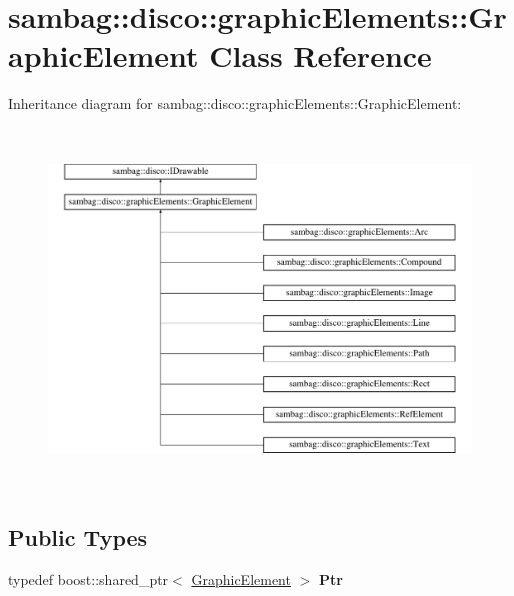 \hypertarget{classsambag_1_1disco_1_1graphic_elements_1_1_graphic_element}{
\section{sambag::disco::graphicElements::GraphicElement Class Reference}
\label{classsambag_1_1disco_1_1graphic_elements_1_1_graphic_element}
}
Inheritance diagram for sambag::disco::graphicElements::GraphicElement:\begin{figure}[H]
\begin{center}
\leavevmode
\includegraphics[height=9.556314cm]{classsambag_1_1disco_1_1graphic_elements_1_1_graphic_element}
\end{center}
\end{figure}
\subsection*{Public Types}
\begin{DoxyCompactItemize}
\item 
\hypertarget{classsambag_1_1disco_1_1graphic_elements_1_1_graphic_element_aaf40beb610d9ba8709007873c30fd4ed}{
typedef boost::shared\_\-ptr$<$ \hyperlink{classsambag_1_1disco_1_1graphic_elements_1_1_graphic_element}{GraphicElement} $>$ {\bfseries Ptr}}
\label{classsambag_1_1disco_1_1graphic_elements_1_1_graphic_element_aaf40beb610d9ba8709007873c30fd4ed}

\end{DoxyCompactItemize}
